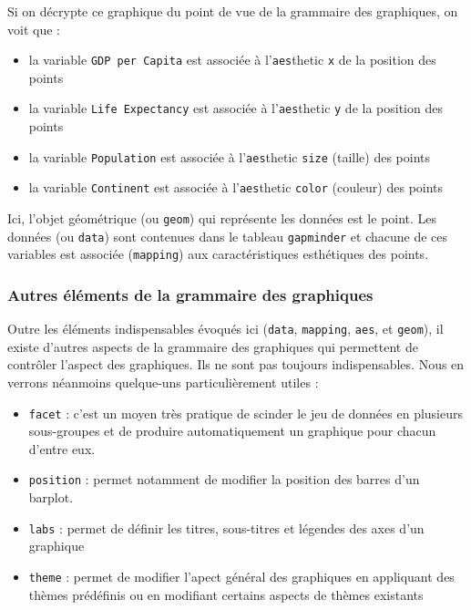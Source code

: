 \documentclass[
  a4paper,
]{article}
\providecommand{\tightlist}{%
  \setlength{\itemsep}{0pt}\setlength{\parskip}{0pt}}
\begin{document}
Si on décrypte ce graphique du point de vue de la grammaire des graphiques, on voit que :

\begin{itemize}
\tightlist
\item
  la variable \texttt{GDP\ per\ Capita} est associée à l'\texttt{aes}thetic \texttt{x} de la position des points
\item
  la variable \texttt{Life\ Expectancy} est associée à l'\texttt{aes}thetic \texttt{y} de la position des points
\item
  la variable \texttt{Population} est associée à l'\texttt{aes}thetic \texttt{size} (taille) des points
\item
  la variable \texttt{Continent} est associée à l'\texttt{aes}thetic \texttt{color} (couleur) des points
\end{itemize}

Ici, l'objet géométrique (ou \texttt{geom}) qui représente les données est le point. Les données (ou \texttt{data}) sont contenues dans le tableau \texttt{gapminder} et chacune de ces variables est associée (\texttt{mapping}) aux caractéristiques esthétiques des points.

\hypertarget{autres-uxe9luxe9ments-de-la-grammaire-des-graphiques}{%
\subsubsection{Autres éléments de la grammaire des graphiques}\label{autres-uxe9luxe9ments-de-la-grammaire-des-graphiques}}

Outre les éléments indispensables évoqués ici (\texttt{data}, \texttt{mapping}, \texttt{aes}, et \texttt{geom}), il existe d'autres aspects de la grammaire des graphiques qui permettent de contrôler l'aspect des graphiques. Ils ne sont pas toujours indispensables. Nous en verrons néanmoins quelque-uns particulièrement utiles :

\begin{itemize}
\tightlist
\item
  \texttt{facet} : c'est un moyen très pratique de scinder le jeu de données en plusieurs sous-groupes et de produire automatiquement un graphique pour chacun d'entre eux.
\item
  \texttt{position} : permet notamment de modifier la position des barres d'un barplot.
\item
  \texttt{labs} : permet de définir les titres, sous-titres et légendes des axes d'un graphique
\item
  \texttt{theme} : permet de modifier l'apect général des graphiques en appliquant des thèmes prédéfinis ou en modifiant certains aspects de thèmes existants
\end{itemize}
\end{document}

